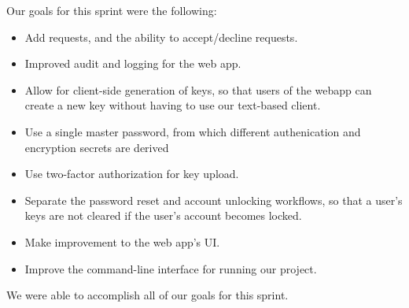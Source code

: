 \documentclass[a4paper,12pt]{article}
\begin{document}
Our goals for this sprint were the following:

\begin{itemize}
\item Add requests, and the ability to accept/decline requests.
\item Improved audit and logging for the web app.
\item Allow for client-side generation of keys, so that users of the webapp can create a new key without having to use our text-based client.
\item Use a single master password, from which different authenication and encryption secrets are derived
\item Use two-factor authorization for key upload.
\item Separate the password reset and account unlocking workflows, so that a user's keys are not cleared if the user's account becomes locked.
\item Make improvement to the web app's UI.
\item Improve the command-line interface for running our project.
\end{itemize}

\bigskip\noindent We were able to accomplish all of our goals for this sprint.
\end{document}
